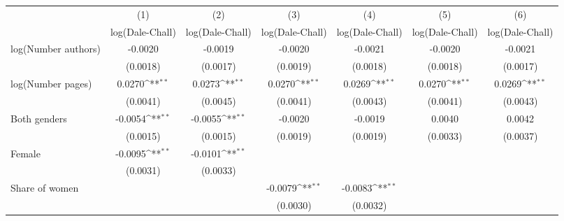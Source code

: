 {
\def\sym#1{\ifmmode^{#1}\else\(^{#1}\)\fi}
\begin{tabular}{l*{6}{c}}
\hline\hline
                    &\multicolumn{1}{c}{(1)}&\multicolumn{1}{c}{(2)}&\multicolumn{1}{c}{(3)}&\multicolumn{1}{c}{(4)}&\multicolumn{1}{c}{(5)}&\multicolumn{1}{c}{(6)}\\
                    &\multicolumn{1}{c}{log(Dale-Chall)}&\multicolumn{1}{c}{log(Dale-Chall)}&\multicolumn{1}{c}{log(Dale-Chall)}&\multicolumn{1}{c}{log(Dale-Chall)}&\multicolumn{1}{c}{log(Dale-Chall)}&\multicolumn{1}{c}{log(Dale-Chall)}\\
\hline
\hspace{3mm}log(Number authors)&     -0.0020        &     -0.0019        &     -0.0020        &     -0.0021        &     -0.0020        &     -0.0021        \\
                    &    (0.0018)        &    (0.0017)        &    (0.0019)        &    (0.0018)        &    (0.0018)        &    (0.0017)        \\
[1em]
\hspace{3mm}log(Number pages)&      0.0270\sym{**}&      0.0273\sym{**}&      0.0270\sym{**}&      0.0269\sym{**}&      0.0270\sym{**}&      0.0269\sym{**}\\
                    &    (0.0041)        &    (0.0045)        &    (0.0041)        &    (0.0043)        &    (0.0041)        &    (0.0043)        \\
[1em]
\hspace{3mm}Both genders&     -0.0054\sym{**}&     -0.0055\sym{**}&     -0.0020        &     -0.0019        &      0.0040        &      0.0042        \\
                    &    (0.0015)        &    (0.0015)        &    (0.0019)        &    (0.0019)        &    (0.0033)        &    (0.0037)        \\
[1em]
\hspace{3mm}Female  &     -0.0095\sym{**}&     -0.0101\sym{**}&                    &                    &                    &                    \\
                    &    (0.0031)        &    (0.0033)        &                    &                    &                    &                    \\
[1em]
\hspace{3mm}Share of women&                    &                    &     -0.0079\sym{**}&     -0.0083\sym{**}&                    &                    \\
                    &                    &                    &    (0.0030)        &    (0.0032)        &                    &                    \\

\end{tabular}}

